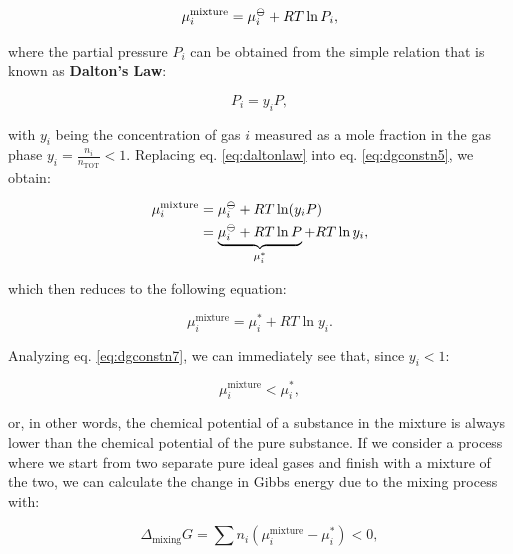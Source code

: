 \documentclass[
  9pt,
]{extbook}
\theoremstyle{definition}
\theoremstyle{definition}
\theoremstyle{definition}
\theoremstyle{definition}
\theoremstyle{remark}
\begin{document}
\begin{equation}
\mu_i^{\text{mixture}} = \mu_i^{-\kern-6pt{\ominus}\kern-6pt-}+ RT \ln P_i,
\label{eq:dgconstn5}
\end{equation}

where the partial pressure \(P_i\) can be obtained from the simple relation that is known as \textbf{Dalton's Law}:

\begin{equation}
P_i = y_i P,
\label{eq:daltonlaw}
\end{equation}

with \(y_i\) being the concentration of gas \(i\) measured as a mole fraction in the gas phase \(y_i=\frac{n_i}{n_{\text{TOT}}} < 1\). Replacing eq. \eqref{eq:daltonlaw} into eq. \eqref{eq:dgconstn5}, we obtain:

\begin{equation}
\begin{aligned}
\mu_i^{\text{mixture}} &= \mu_i^{-\kern-6pt{\ominus}\kern-6pt-}+ RT \ln (y_i P) \\
 &= \underbrace{\mu_i^{-\kern-6pt{\ominus}\kern-6pt-}+ RT \ln P}_{\mu_i^*} + RT \ln y_i,
\end{aligned}
\label{eq:dgconstn6}
\end{equation}

which then reduces to the following equation:

\begin{equation}
\mu_i^{\text{mixture}} = \mu_i^* + RT \ln y_i.
\label{eq:dgconstn7}
\end{equation}

Analyzing eq. \eqref{eq:dgconstn7}, we can immediately see that, since \(y_i < 1\):

\begin{equation}
\mu_i^{\text{mixture}} < \mu_i^*,
\label{eq:dgconstn8}
\end{equation}

or, in other words, the chemical potential of a substance in the mixture is always lower than the chemical potential of the pure substance. If we consider a process where we start from two separate pure ideal gases and finish with a mixture of the two, we can calculate the change in Gibbs energy due to the mixing process with:

\begin{equation}
\Delta_{\text{mixing}} G = \sum n_i \left( \mu_i^{\text{mixture}} - \mu_i^* \right)  < 0,
\label{eq:dgconstn9}
\end{equation}
\end{document}
